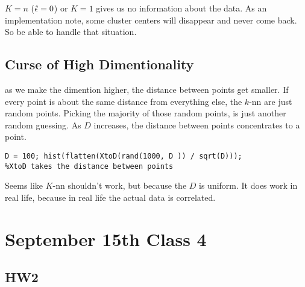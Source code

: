 $K=n$ ($\hat{\epsilon}=0$) or $K=1$ gives us no information about the data. As an implementation
note, some cluster centers will disappear and never come back. So be able to handle that situation.

\subsection{Curse of High Dimentionality}
\label{sec:curseofhighdimentionality}

as we make the dimention higher, the distance between points get
smaller. If every point is about the same distance from everything
else, the $k$-nn are just random points. Picking the majority of those
random points, is just another random guessing. As $D$ increases, the
distance between points concentrates to a point.
\begin{verbatim}
D = 100; hist(flatten(XtoD(rand(1000, D )) / sqrt(D)));
%XtoD takes the distance between points
\end{verbatim}

Seems like $K$-nn shouldn't work, but because the $D$ is uniform. It does work in real life,
because in real life the actual data is correlated.
\pagebreak
\section{September 15th Class 4}
\label{sec:class4}

\subsection{HW2}
\label{sec:hw2}

